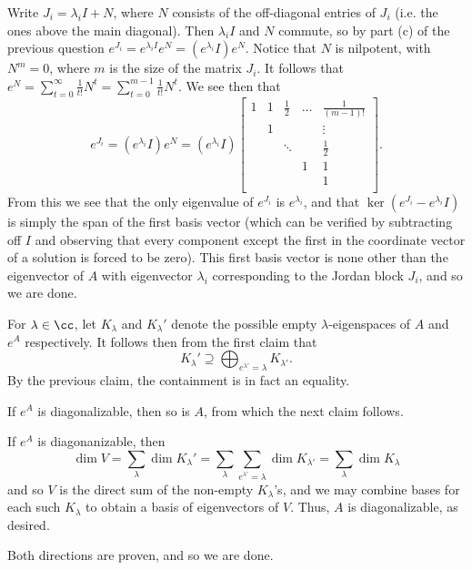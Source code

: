 \documentclass{scrartcl}
\begin{document}
\begin{solution}
\begin{subproof}
        Write $J_i=\lambda_iI+N$, where $N$ consists of the off-diagonal entries of $J_i$ (i.e. the ones above the main diagonal). Then $\lambda_i I$ and $N$ commute, so by part (c) of the previous question $e^{J_i}=e^{\lambda_iI}e^N=(e^{\lambda_i}I)e^N$. Notice that $N$ is nilpotent, with $N^m=0$, where $m$ is the size of the matrix $J_i$. It follows that $e^N=\sum_{t=0}^\infty \tfrac{1}{t!}N^t=\sum_{t=0}^{m-1} \tfrac{1}{t!}N^t$. We see then that
        \[e^{J_i}=(e^{\lambda_i}I)e^N=(e^{\lambda_i}I)
        \begin{bmatrix}
        1 & 1 & \tfrac{1}{2} & \hdots & \tfrac{1}{(m-1)!} \\
        & 1 & & & \vdots \\
        & & \ddots & & \tfrac{1}{2} \\
        & & & 1 & 1 \\
        & & & & 1\\
        \end{bmatrix}.\]
        From this we see that the only eigenvalue of $e^{J_i}$ is $e^{\lambda_i}$, and that $\ker(e^{J_i}-e^{\lambda_i}I)$ is simply the span of the first basis vector (which can be verified by subtracting off $I$ and observing that every component except the first in the coordinate vector of a solution is forced to be zero). This first basis vector is none other than the eigenvector of $A$ with eigenvector $\lambda_i$ corresponding to the Jordan block $J_i$, and so we are done.
        \end{subproof}
        
        For $\lambda\in \cc$, let $K_\lambda$ and $K_\lambda'$ denote the possible empty $\lambda$-eigenspaces of $A$ and $e^A$ respectively. It follows then from the first claim that 
        \[K_\lambda'\supseteq\bigoplus_{e^{\lambda'}=\lambda} K_{\lambda'}.\]
        By the previous claim, the containment is in fact an equality.
        \begin{lemma}
        If $e^A$ is diagonalizable, then so is $A$, from which the next claim follows.
        \end{lemma}
        \begin{subproof}
        If $e^A$ is diagonanizable, then \[\dim V=\sum_\lambda \dim K_\lambda'=\sum_\lambda \sum_{e^{\lambda'}=\lambda}\dim K_{\lambda'}=\sum_{\lambda}\dim K_\lambda\] and so $V$ is the direct sum of the non-empty $K_\lambda$'s, and we may combine bases for each such $K_\lambda$ to obtain a basis of eigenvectors of $V$. Thus, $A$ is diagonalizable, as desired.
        \end{subproof}
        
        Both directions are proven, and so we are done.
        \end{solution}
\end{document}
